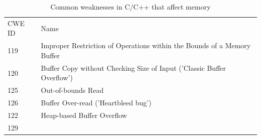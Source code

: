 \begin{longtable}[]{@{}ll@{}}
\caption{Common weaknesses in C/C++ that affect memory}\tabularnewline
\toprule
\begin{minipage}[t]{0.19\columnwidth}\raggedright\strut
CWE ID\strut
\end{minipage} & \begin{minipage}[t]{0.75\columnwidth}\raggedright\strut
Name\strut
\end{minipage}\tabularnewline
\begin{minipage}[t]{0.19\columnwidth}\raggedright\strut
119\strut
\end{minipage} & \begin{minipage}[t]{0.75\columnwidth}\raggedright\strut
Improper Restriction of Operations within the Bounds of a Memory
Buffer\strut
\end{minipage}\tabularnewline
\begin{minipage}[t]{0.19\columnwidth}\raggedright\strut
120\strut
\end{minipage} & \begin{minipage}[t]{0.75\columnwidth}\raggedright\strut
Buffer Copy without Checking Size of Input ('Classic Buffer
Overflow')\strut
\end{minipage}\tabularnewline
\begin{minipage}[t]{0.19\columnwidth}\raggedright\strut
125\strut
\end{minipage} & \begin{minipage}[t]{0.75\columnwidth}\raggedright\strut
Out-of-bounds Read\strut
\end{minipage}\tabularnewline
\begin{minipage}[t]{0.19\columnwidth}\raggedright\strut
126\strut
\end{minipage} & \begin{minipage}[t]{0.75\columnwidth}\raggedright\strut
Buffer Over-read ('Heartbleed bug')\strut
\end{minipage}\tabularnewline
\begin{minipage}[t]{0.19\columnwidth}\raggedright\strut
122\strut
\end{minipage} & \begin{minipage}[t]{0.75\columnwidth}\raggedright\strut
Heap-based Buffer Overflow\strut
\end{minipage}\tabularnewline
\begin{minipage}[t]{0.19\columnwidth}\raggedright\strut
129\strut
\end{minipage} & \begin{minipage}[t]{0.75\columnwidth}\raggedright\strut

\end{minipage}
\end{longtable}
